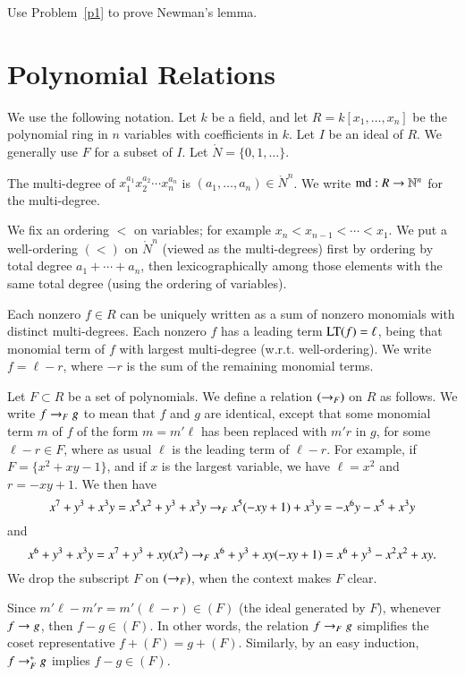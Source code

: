 \documentclass{llncs}
\def\op#1{{\hbox{#1}}}
\def\l{<}
\begin{document}
\begin{problem} Use Problem~\ref{p1} to prove Newman's lemma.
\end{problem}

\section{Polynomial Relations}

We use the following notation.   Let $k$ be a field, and let $R=k[x_1,\ldots,x_n]$ be the polynomial ring in $n$ variables with coefficients in $k$.  Let $I$ be an ideal of $R$.  We generally use $F$ for a subset of $I$.  Let $\ring{N}=\{0,1,\ldots\}$.

The multi-degree of $x_1^{a_1} x_2^{a_2} \cdots x_n^{a_n}$ is $(a_1,\ldots,a_n)\in \ring{N}^n$.
We write $\op{md}:R\to \ring{N}^n$ for the multi-degree.

We fix an ordering $\l$ on variables; for example $x_n < x_{n-1} < \cdots < x_1$.  We put a well-ordering $(<)$ on $\ring{N}^n$ (viewed as the multi-degrees)  first by ordering
by total degree $a_1+\cdots+a_n$, then lexicographically among those elements with the same total degree (using the ordering of variables).

Each nonzero $f\in R$ can be uniquely written as a sum of nonzero monomials with distinct multi-degrees.  Each nonzero $f$ has a leading term $\LT(f)=\ell$, being that monomial term of $f$ with largest multi-degree (w.r.t. well-ordering).  We write $f = \ell - r$, where $-r$ is the sum of the remaining monomial terms.


Let $F\subset R$ be a set of polynomials.  We define a relation $(\rightarrow_F)$ on $R$ as follows.
We write $f \rightarrow_F g$ to mean that $f$ and $g$ are identical, except that some monomial term $m$ of $f$ of the form $m=m' \ell$ has been replaced with $m' r$ in $g$, for some
$\ell-r\in F$, where as usual $\ell$ is the leading term of $\ell-r$.
For example, if $F = \{x^2 + xy - 1\}$, and if $x$ is the largest variable,
we have $\ell=x^2$ and $r= - x y +1$. We then
have
\[
x^7 + y^3 + x^3 y = x^5 x^2 + y^3 + x^3 y \rightarrow_F x^5 (- x y + 1) + x^3 y = -x^6 y - x^5 + x^3 y
\]
and
\[
x^6 + y^3 + x^3 y = x^7 + y^3 + x y (x^2) \rightarrow_F x^6 + y^3 + x y (-x y + 1) = x^6 + y^3 - x^2 x^2 + x y.
\]
We drop the subscript $F$ on $(\rightarrow_F)$, when the context makes $F$ clear.

Since $m' \ell - m' r = m'(\ell-r)\in (F)$ (the ideal generated by $F$), 
whenever $f\rightarrow g$, then $f- g\in (F)$.
In other words, the relation $f \rightarrow_F g$ simplifies the coset representative
$f+(F) = g + (F)$.  Similarly, by an easy induction, $f\rightarrow^*_F g$ implies $f - g \in (F)$.
\end{document}
